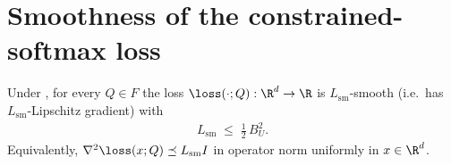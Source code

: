 \section{Smoothness of the constrained-softmax loss}
\label{sec:smoothness}

\begin{lemma}\label{lem:smoothness}
Under , for every $Q \in F$ the loss
$\loss(\cdot; Q): \R^d \to \R$ is $L_{\mathrm{sm}}$-smooth (i.e.\ has
$L_{\mathrm{sm}}$-Lipschitz gradient) with
\begin{align}\label{eq:smoothness_const}
   L_{\mathrm{sm}} \;\le\; \tfrac{1}{2}\, B_U^2.
\end{align}
Equivalently, $\nabla^2 \loss(x; Q) \preceq L_{\mathrm{sm}} I$
in operator norm uniformly in $x \in \R^d$.
\end{lemma}

